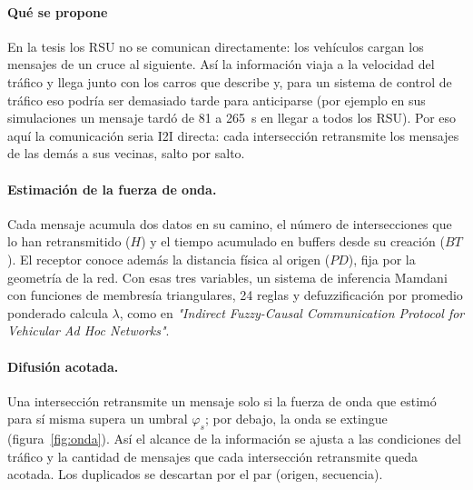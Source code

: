 \documentclass[11pt,letterpaper]{article}
\begin{document}
\paragraph{Qué se propone} En la tesis los RSU no se comunican
directamente: los vehículos cargan los mensajes de un cruce al siguiente. 
Así la información viaja a la velocidad del tráfico
y llega junto con los carros que describe y, para un sistema de control de tráfico
eso podría ser demasiado tarde para anticiparse (por ejemplo en
sus simulaciones un mensaje tardó de 81 a 265~s en llegar a todos los RSU). Por eso
aquí la comunicación seria I2I directa: cada intersección retransmite los
mensajes de las demás a sus vecinas, salto por salto.

\paragraph{Estimación de la fuerza de onda.} Cada mensaje acumula dos datos en su
camino, el número de intersecciones que lo han retransmitido ($H$) y el tiempo
acumulado en buffers desde su creación ($BT$). El receptor conoce además la
distancia física al origen ($PD$), fija por la geometría de la red. Con esas tres
variables, un sistema de inferencia Mamdani con funciones de
membresía triangulares, 24 reglas y defuzzificación por promedio ponderado
calcula $\lambda$, como en \emph{"Indirect Fuzzy-Causal Communication Protocol for Vehicular 
Ad Hoc Networks"}.

\paragraph{Difusión acotada.} Una intersección retransmite un mensaje solo si la
fuerza de onda que estimó para sí misma supera un umbral $\varphi_s$; por debajo,
la onda se extingue (figura~\ref{fig:onda}). Así el alcance de la información se
ajusta a las condiciones del tráfico y la cantidad de mensajes que cada intersección
retransmite queda acotada. Los duplicados se descartan por el par
(origen, secuencia).
\end{document}
